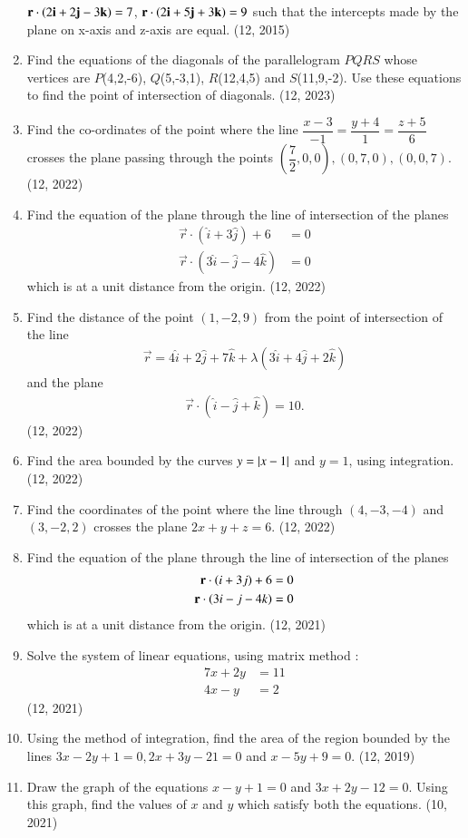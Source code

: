 \begin{enumerate}[label=\thesubsection.\arabic*, ref=\thesubsection.\theenumi]
$\mathbf{r}\cdot\left(2\mathbf{i}+2\mathbf{j}-3\mathbf{k}\right)=7$, \quad $\mathbf{r}\cdot\left(2\mathbf{i}+5\mathbf{j}+3\mathbf{k}\right)=9$
such that the intercepts made by the plane on x-axis and z-axis are equal. \hfill (12, 2015)
\item Find the equations of the diagonals of the parallelogram $PQRS$ whose vertices are $P$(4,2,-6), $Q$(5,-3,1), $R$(12,4,5) and $S$(11,9,-2). Use these equations to find the point of intersection of diagonals. \hfill (12, 2023)
\item Find the co-ordinates of the point where the line $\dfrac{x-3}{-1}=\dfrac{y+4}{1}=\dfrac{z+5}{6}$ crosses the plane passing through the points $\left(\dfrac{7}{2},0,0\right),(0,7,0),(0,0,7)$. \hfill (12, 2022)

\item Find the equation of the plane through the line of intersection of the planes
	\begin{align}
		\vec{r}\cdot(\hat{i}+3\hat{j})+6&=0\\
		\vec{r}\cdot(3\hat{i}-\hat{j}-4\hat{k})&=0
	\end{align}
	which is at a unit distance from the origin. \hfill (12, 2022)
\item Find the distance of the point $(1,-2, 9)$ from the point of intersection of the line
	\begin{align}
		\vec{r}=4\hat{i}+2\hat{j}+7\hat{k}+\lambda(3\hat{i}+4\hat{j}+2\hat{k})
	\end{align}
	and the plane
	\begin{align}
		\vec{r}\cdot(\hat{i}-\hat{j}+\hat{k})=10.
	\end{align}
\hfill (12, 2022)

\item Find the area bounded by the curves $y=\left\vert x-1\right\vert$ and $y=1$, using integration. \hfill (12, 2022)

\item Find the coordinates of the point where the line through $(4,-3,-4)$ and $(3,-2,2)$ crosses the plane $2x+y+z=6$. \hfill (12, 2022)
\item Find the equation of the plane through the line of intersection of the planes 
\begin{align}
  \mathbf{r} \cdot \left(i+3j\right) + 6 &= 0 \\  
  \mathbf{r} \cdot \left(3i - j - 4k\right) &= 0
\end{align}
which is at a unit distance from the origin. \hfill (12, 2021)
\item Solve the system of linear equations, using matrix method : 
\begin{align}
  7x + 2y &= 11\\
  4x - y &= 2
\end{align}
\hfill (12, 2021)
\item Using the method of integration, find the area of the region bounded by the lines $3x - 2y + 1 = 0, 2x + 3y - 21 = 0$ and $x - 5y + 9 = 0$. \hfill (12, 2019)
\item Draw the graph of the equations $x - y + 1 = 0$ and $3x + 2y - 12 = 0$. Using this graph, find the values of $x$ and $y$ which satisfy both the equations.
\hfill (10, 2021)


\end{enumerate}
